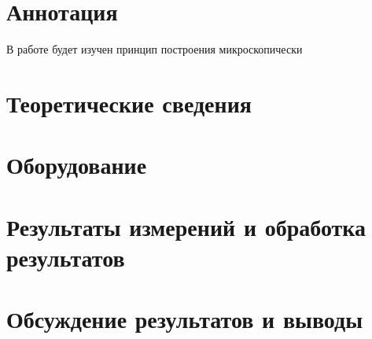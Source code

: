 \documentclass[a4paper, 12pt]{article}
\begin{document}

\section{Аннотация}
В работе будет изучен принцип построения микроскопически




\section{Теоретические сведения}







\section{Оборудование}







\section{Результаты измерений и обработка результатов}







\section{Обсуждение результатов и выводы}
\end{document}
